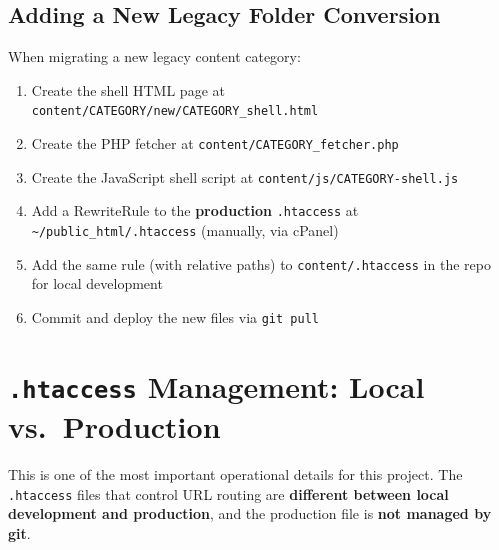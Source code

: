 \documentclass[12pt]{article}
\begin{document}
\subsection{Adding a New Legacy Folder Conversion}

When migrating a new legacy content category:

\begin{enumerate}
    \item Create the shell HTML page at \texttt{content/CATEGORY/new/CATEGORY\_shell.html}
    \item Create the PHP fetcher at \texttt{content/CATEGORY\_fetcher.php}
    \item Create the JavaScript shell script at \texttt{content/js/CATEGORY-shell.js}
    \item Add a RewriteRule to the \textbf{production} \texttt{.htaccess} at \texttt{\textasciitilde/public\_html/.htaccess} (manually, via cPanel)
    \item Add the same rule (with relative paths) to \texttt{content/.htaccess} in the repo for local development
    \item Commit and deploy the new files via \texttt{git pull}
\end{enumerate}

\section{\texttt{.htaccess} Management: Local vs.\ Production}
\label{sec:htaccess-differences}

This is one of the most important operational details for this project. The \texttt{.htaccess} files that control URL routing are \textbf{different between local development and production}, and the production file is \textbf{not managed by git}.
\end{document}

